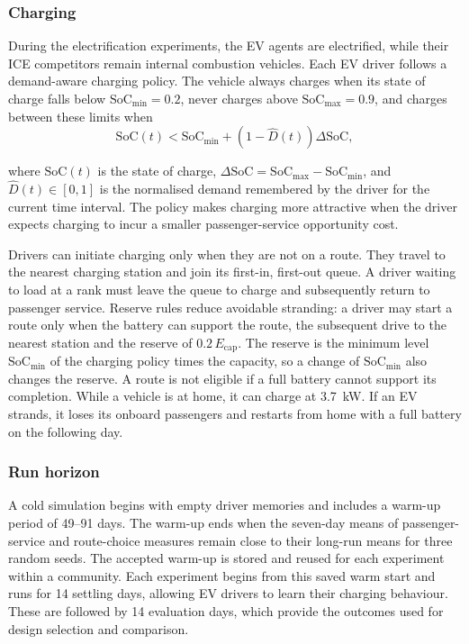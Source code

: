 \documentclass{elsarticle}
\begin{document}
\subsubsection{Charging}

During the electrification experiments, the EV agents are electrified, while their ICE competitors remain internal combustion vehicles. Each EV driver follows a demand-aware charging policy. The vehicle always charges when its state of charge falls below \(\text{SoC}_\mathrm{min}=0.2\), never charges above \(\text{SoC}_\mathrm{max}=0.9\), and charges between these limits when
\begin{equation}
    \text{SoC}(t) < \text{SoC}_\mathrm{min} + \left(1 - \hat{D}(t)\right) \Delta \text{SoC},
\end{equation}

\noindent where \(\text{SoC}(t)\) is the state of charge, \(\Delta \text{SoC} = \text{SoC}_\mathrm{max} - \text{SoC}_\mathrm{min}\), and \(\hat{D}(t)\in[0,1]\) is the normalised demand remembered by the driver for the current time interval. The policy makes charging more attractive when the driver expects charging to incur a smaller passenger-service opportunity cost.

Drivers can initiate charging only when they are not on a route. They travel to the nearest charging station and join its first-in, first-out queue. A driver waiting to load at a rank must leave the queue to charge and subsequently return to passenger service. Reserve rules reduce avoidable stranding: a driver may start a route only when the battery can support the route, the subsequent drive to the nearest station and the reserve of \(0.2\,E_\mathrm{cap}\). The reserve is the minimum level \(\text{SoC}_\mathrm{min}\) of the charging policy times the capacity, so a change of \(\text{SoC}_\mathrm{min}\) also changes the reserve. A route is not eligible if a full battery cannot support its completion. While a vehicle is at home, it can charge at 3.7~kW. If an EV strands, it loses its onboard passengers and restarts from home with a full battery on the following day.

\subsubsection{Run horizon}
A cold simulation begins with empty driver memories and includes a warm-up period of 49--91 days. The warm-up ends when the seven-day means of passenger-service and route-choice measures remain close to their long-run means for three random seeds. The accepted warm-up is stored and reused for each experiment within a community. Each experiment begins from this saved warm start and runs for 14 settling days, allowing EV drivers to learn their charging behaviour. These are followed by 14 evaluation days, which provide the outcomes used for design selection and comparison.
\end{document}
